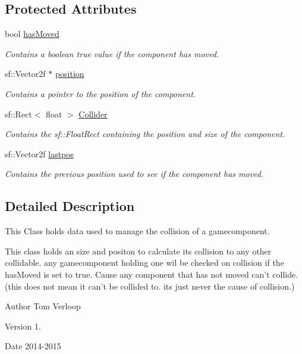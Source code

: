 \subsection*{Protected Attributes}
\begin{DoxyCompactItemize}
\item 
bool \hyperlink{class_collidable_afe5442fd3a82abe62b95e93248d5f4a1}{has\-Moved}
\begin{DoxyCompactList}\small\item\em Contains a boolean true value if the component has moved. \end{DoxyCompactList}\item 
sf\-::\-Vector2f $\ast$ \hyperlink{class_collidable_aa6c2e113d920df8c0d5da2a244f924bd}{position}
\begin{DoxyCompactList}\small\item\em Contains a pointer to the position of the component. \end{DoxyCompactList}\item 
sf\-::\-Rect$<$ float $>$ \hyperlink{class_collidable_a474de18f0027a4e089be1097f6d7bcc7}{Collider}
\begin{DoxyCompactList}\small\item\em Contains the sf\-::\-Float\-Rect containing the position and size of the component. \end{DoxyCompactList}\item 
sf\-::\-Vector2f \hyperlink{class_collidable_ae50dbf8f9d1f584d3a5d5c3445fbe786}{lastpos}
\begin{DoxyCompactList}\small\item\em Contains the previous position used to see if the component has moved. \end{DoxyCompactList}\end{DoxyCompactItemize}


\subsection{Detailed Description}
This Class holds data used to manage the collision of a gamecomponent. 

This class holds an size and positon to calculate its collision to any other collidable. any gamecomponent holding one wil be checked on collision if the has\-Moved is set to true. Cause any component that has not moved can't collide. (this does not mean it can't be collided to. its just never the cause of collision.) \begin{DoxyAuthor}{Author}
Tom Verloop 
\end{DoxyAuthor}
\begin{DoxyVersion}{Version}
1. 
\end{DoxyVersion}
\begin{DoxyDate}{Date}
2014-\/2015 
\end{DoxyDate}


